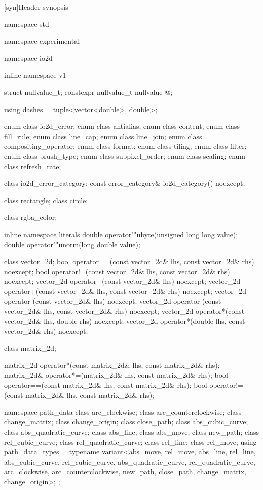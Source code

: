 [syn]{Header  synopsis}

%
\begin{codeblock}

namespace std { namespace experimental {
  namespace io2d { inline namespace v1 {

  struct nullvalue_t;
  constexpr nullvalue_t nullvalue{ @\impdef@ };

  using dashes = tuple<vector<double>, double>;

  enum class io2d_error;
  enum class antialias;
  enum class content;
  enum class fill_rule;
  enum class line_cap;
  enum class line_join;
  enum class compositing_operator;
  enum class format;
  enum class tiling;
  enum class filter;
  enum class brush_type;
  enum class subpixel_order;
  enum class scaling;
  enum class refresh_rate;

  class io2d_error_category;
  const error_category& io2d_category() noexcept;

  class rectangle;
  class circle;

  class rgba_color;

  inline namespace literals {
    double operator""ubyte(unsigned long long value);
    double operator""unorm(long double value);
  }
  
  class vector_2d;
  bool operator==(const vector_2d& lhs, const vector_2d& rhs) noexcept;
  bool operator!=(const vector_2d& lhs, const vector_2d& rhs) noexcept;
  vector_2d operator+(const vector_2d& lhs) noexcept;
  vector_2d operator+(const vector_2d& lhs, const vector_2d& rhs) noexcept;
  vector_2d operator-(const vector_2d& lhs) noexcept;
  vector_2d operator-(const vector_2d& lhs, const vector_2d& rhs) noexcept;
  vector_2d operator*(const vector_2d& lhs, double rhs) noexcept;
  vector_2d operator*(double lhs, const vector_2d& rhs) noexcept;

  class matrix_2d;

  matrix_2d operator*(const matrix_2d& lhs, const matrix_2d& rhs);
  matrix_2d& operator*=(matrix_2d& lhs, const matrix_2d& rhs);
  bool operator==(const matrix_2d& lhs, const matrix_2d& rhs);
  bool operator!=(const matrix_2d& lhs, const matrix_2d& rhs);

  namespace path_data {
    class arc_clockwise;
    class arc_counterclockwise;
    class change_matrix;
    class change_origin;
    class close_path;
    class abs_cubic_curve;
    class abs_quadratic_curve;
    class abs_line;
    class abs_move;
    class new_path;
    class rel_cubic_curve;
    class rel_quadratic_curve;
    class rel_line;
    class rel_move;
    using path_data_types = typename variant<abs_move, rel_move,
      abs_line, rel_line, abs_cubic_curve, rel_cubic_curve, 
      abs_quadratic_curve, rel_quadratic_curve, arc_clockwise, 
      arc_counterclockwise, new_path, close_path, change_matrix, change_origin>;
  };
  
}}}}
\end{codeblock}
